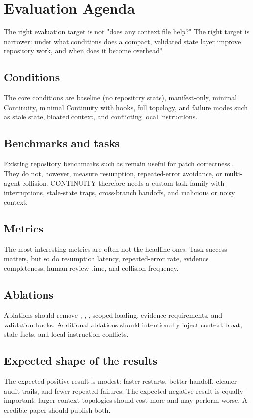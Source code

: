 
\section{Evaluation Agenda}



The right evaluation target is not "does any context file help?" The right target is narrower: under what conditions does a compact, validated state layer improve repository work, and when does it become overhead?

\subsection{Conditions}

The core conditions are baseline (no repository state), manifest-only, minimal Continuity, minimal Continuity with hooks, full topology, and failure modes such as stale state, bloated context, and conflicting local instructions.

\subsection{Benchmarks and tasks}

Existing repository benchmarks such as \SWEbench{} remain useful for patch correctness \cite{Jimenez2024SWEbench}. They do not, however, measure resumption, repeated-error avoidance, or multi-agent collision. CONTINUITY therefore needs a custom task family with interruptions, stale-state traps, cross-branch handoffs, and malicious or noisy context.

\subsection{Metrics}



The most interesting metrics are often not the headline ones. Task success matters, but so do resumption latency, repeated-error rate, evidence completeness, human review time, and collision frequency.

\subsection{Ablations}

Ablations should remove , , , scoped loading, evidence requirements, and validation hooks. Additional ablations should intentionally inject context bloat, stale facts, and local instruction conflicts.

\subsection{Expected shape of the results}

The expected positive result is modest: faster restarts, better handoff, cleaner audit trails, and fewer repeated failures. The expected negative result is equally important: larger context topologies should cost more and may perform worse. A credible paper should publish both.

